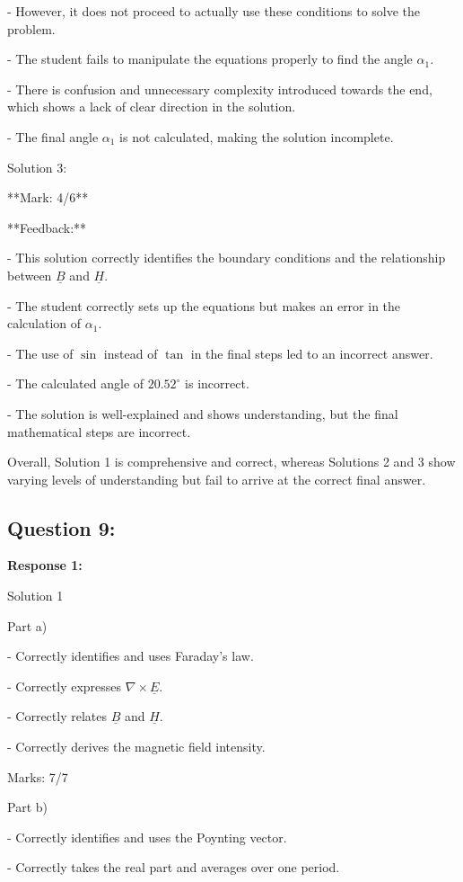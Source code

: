 \documentclass[a4paper,11pt]{article}
\begin{document}
- However, it does not proceed to actually use these conditions to solve the problem.

- The student fails to manipulate the equations properly to find the angle \( \alpha_1 \).

- There is confusion and unnecessary complexity introduced towards the end, which shows a lack of clear direction in the solution.

- The final angle \( \alpha_1 \) is not calculated, making the solution incomplete.

Solution 3:

**Mark: 4/6**

**Feedback:**

- This solution correctly identifies the boundary conditions and the relationship between \( \underline{B} \) and \( \underline{H} \).

- The student correctly sets up the equations but makes an error in the calculation of \( \alpha_1 \).

- The use of \( \sin \) instead of \( \tan \) in the final steps led to an incorrect answer.

- The calculated angle of \( 20.52^\circ \) is incorrect.

- The solution is well-explained and shows understanding, but the final mathematical steps are incorrect.

Overall, Solution 1 is comprehensive and correct, whereas Solutions 2 and 3 show varying levels of understanding but fail to arrive at the correct final answer.

\subsection*{Question 9:}

\textbf{Response 1:}

Solution 1

Part a)

- Correctly identifies and uses Faraday's law.

- Correctly expresses \(\nabla \times \underline{E}\).

- Correctly relates \(\underline{B}\) and \(\underline{H}\).

- Correctly derives the magnetic field intensity.

Marks: 7/7

Part b)

- Correctly identifies and uses the Poynting vector.

- Correctly takes the real part and averages over one period.
\end{document}
